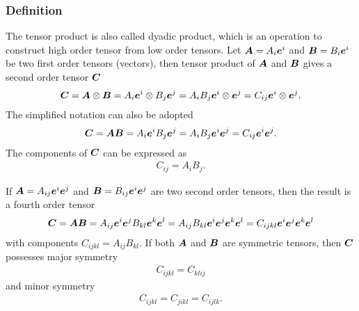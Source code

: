 \subsubsection{Definition}
The tensor product is also called dyadic product, which is an operation to construct high order tensor from low order tensors. Let $\bm{A}=A_i\bm{e}^i$ and $\bm{B}=B_i\bm{e}^i$ be two first order tensors (vectors), then tensor product of $\bm{A}$ and $\bm{B}$ gives a second order tensor $\bm{C}$
\begin{gather}
\bm{C}=\bm{A}\otimes\bm{B}=A_i\bm{e}^i\otimes{}B_j\bm{e}^j=A_iB_j\bm{e}^i\otimes{}\bm{e}^j=C_{ij}\bm{e}^i\otimes{}\bm{e}^j.
\end{gather}
The simplified notation can also be adopted
\begin{gather}\label{eq:1st_tensor_product}
\bm{C}=\bm{A}\bm{B}=A_i\bm{e}^iB_j\bm{e}^j=A_iB_j\bm{e}^i\bm{e}^j=C_{ij}\bm{e}^i\bm{e}^j.
\end{gather}
The components of $\bm{C}$ can be expressed as
\begin{gather}
C_{ij}=A_{i}B_{j}.
\end{gather}

If $\bm{A}=A_{ij}\bm{e}^i\bm{e}^j$ and $\bm{B}=B_{ij}\bm{e}^i\bm{e}^j$ are two second order tensors, then the result is a fourth order tensor
\begin{gather}\label{eq:2nd_tensor_product}
\bm{C}=\bm{A}\bm{B}=A_{ij}\bm{e}^i\bm{e}^jB_{kl}\bm{e}^k\bm{e}^l=A_{ij}B_{kl}\bm{e}^i\bm{e}^j\bm{e}^k\bm{e}^l=C_{ijkl}\bm{e}^i\bm{e}^j\bm{e}^k\bm{e}^l
\end{gather}
with components $C_{ijkl}=A_{ij}B_{kl}$. If both $\bm{A}$ and $\bm{B}$ are symmetric tensors, then $\bm{C}$ possesses major symmetry
\begin{gather}
C_{ijkl}=C_{klij}
\end{gather}
and minor symmetry
\begin{gather}
C_{ijkl}=C_{jikl}=C_{ijlk}.
\end{gather}
